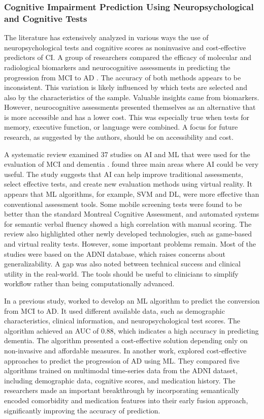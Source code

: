 \subsubsection{Cognitive Impairment Prediction Using Neuropsychological and Cognitive Tests}
The literature has extensively analyzed in various ways the use of neuropsychological tests and cognitive scores as noninvasive and cost-effective predictors of CI. A group of researchers compared the efficacy of molecular and radiological biomarkers and neurocognitive assessments in predicting the progression from MCI to AD \cite{Daou2023Can}. The accuracy of both methods appears to be inconsistent. This variation is likely influenced by which tests are selected and also by the characteristics of the sample. Valuable insights came from biomarkers. However, neurocognitive assessments presented themselves as an alternative that is more accessible and has a lower cost. This was especially true when tests for memory, executive function, or language were combined. A focus for future research, as suggested by the authors, should be on accessibility and cost.

A systematic review examined 37 studies on AI and ML that were used for the evaluation of MCI and dementia \cite{Veneziani2024Applications}. \citeauthor{Veneziani2024Applications} found three main areas where AI could be very useful. The study suggests that AI can help improve traditional assessments, select effective tests, and create new evaluation methods using virtual reality. It appears that ML algorithms, for example, SVM and DL, were more effective than conventional assessment tools. Some mobile screening tests were found to be better than the standard Montreal Cognitive Assessment, and automated systems for semantic verbal fluency showed a high correlation with manual scoring. The review also highlighted other newly developed technologies, such as game-based and virtual reality tests. However, some important problems remain. Most of the studies were based on the ADNI database, which raises concerns about generalizability. A gap was also noted between technical success and clinical utility in the real-world. The tools should be useful to clinicians to simplify workflow rather than being computationally advanced.

In a previous study,  worked to develop an ML algorithm to predict the conversion from MCI to AD. It used different available data, such as demographic characteristics, clinical information, and neuropsychological test scores. The algorithm achieved an AUC of 0.88, which indicates a high accuracy in predicting dementia. The algorithm presented a cost-effective solution depending only on non-invasive and affordable measures. In another work,  explored cost-effective approaches to predict the progression of AD using ML. They compared five algorithms trained on multimodal time-series data from the ADNI dataset, including demographic data, cognitive scores, and medication history. The researchers made an important breakthrough by incorporating semantically encoded comorbidity and medication features into their early fusion approach, significantly improving the accuracy of prediction. 

